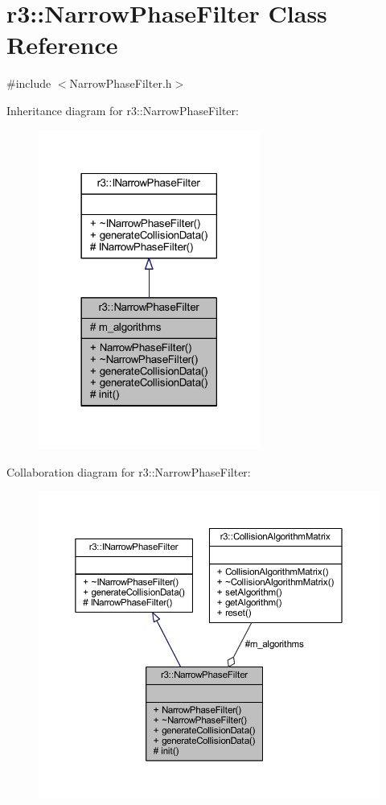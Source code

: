 \hypertarget{classr3_1_1_narrow_phase_filter}{}\section{r3\+:\+:Narrow\+Phase\+Filter Class Reference}
\label{classr3_1_1_narrow_phase_filter}


{\ttfamily \#include $<$Narrow\+Phase\+Filter.\+h$>$}



Inheritance diagram for r3\+:\+:Narrow\+Phase\+Filter\+:\nopagebreak
\begin{figure}[H]
\begin{center}
\leavevmode
\includegraphics[width=206pt]{classr3_1_1_narrow_phase_filter__inherit__graph}
\end{center}
\end{figure}


Collaboration diagram for r3\+:\+:Narrow\+Phase\+Filter\+:\nopagebreak
\begin{figure}[H]
\begin{center}
\leavevmode
\includegraphics[width=350pt]{classr3_1_1_narrow_phase_filter__coll__graph}
\end{center}
\end{figure}
